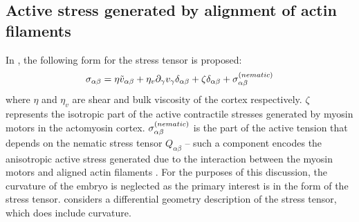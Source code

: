 \subsection{Active stress generated by alignment of actin filaments}\label{subsec:activeNematicStressModelAC}
In \cite{reymann2016cortical}, the following form for the stress tensor is proposed:
\begin{equation}\label{eq:totalStressModelAC}
    \sigma_{\alpha\beta} = \eta \Tilde{v}_{\alpha\beta} + \eta_v \inlinePartial{\gamma}{v_\gamma}\delta_{\alpha\beta} + \zeta \delta_{\alpha\beta} + \speciesSuper{\sigma}{nematic}_{\alpha\beta}
\end{equation}
where $\eta$ and $\eta_v$ are shear and bulk viscosity of the cortex respectively. $\zeta$ represents the isotropic part of the active contractile stresses generated by myosin motors in the actomyosin cortex. $\sigma^{(nematic)}_{\alpha\beta}$ is the part of the active tension that depends on the nematic stress tensor $Q_{\alpha\beta}$ -- such a component encodes the anisotropic active stress generated due to the interaction between the myosin motors and aligned actin filaments \citep{reymann2016cortical}. For the purposes of this discussion, the curvature of the embryo is neglected as the primary interest is in the form of the stress tensor. \cite{reymann2016cortical} considers a differential geometry description of the stress tensor, which does include curvature.

